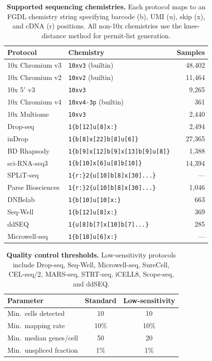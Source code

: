 \documentclass[10pt,twocolumn,letterpaper]{article}
\begin{document}
\begin{table}[t]
  \centering
  \caption{\textbf{Supported sequencing chemistries.} Each protocol maps to
    an FGDL chemistry string specifying barcode (b), UMI (u), skip (x),
    and cDNA (r) positions. All non-10x chemistries use the knee-distance
    method for permit-list generation.}
  \label{tab:protocols}
  \small
  \begin{tabular}{llr}
    \toprule
    \textbf{Protocol} & \textbf{Chemistry} & \textbf{Samples} \\
    \midrule
    10x Chromium v3   & \texttt{10xv3} (builtin) & 48,402 \\
    10x Chromium v2   & \texttt{10xv2} (builtin) & 11,464 \\
    10x 5$'$ v3       & \texttt{10xv3}  & 9,265 \\
    10x Chromium v4   & \texttt{10xv4-3p} (builtin) & 361 \\
    10x Multiome      & \texttt{10xv3}  & 2,440 \\
    Drop-seq          & \texttt{1\{b[12]u[8]x:\}} & 2,494 \\
    inDrop            & \texttt{1\{b[8]x[22]b[8]u[6]\}} & 27,365 \\
    BD Rhapsody       & \texttt{1\{b[9]x[12]b[9]x[13]b[9]u[8]\}} & 1,388 \\
    sci-RNA-seq3      & \texttt{1\{b[10]x[6]u[8]b[10]\}} & 14,394 \\
    SPLiT-seq         & \texttt{1\{r:\}2\{u[10]b[8]x[30]...\}} & --- \\
    Parse Biosciences & \texttt{1\{r:\}2\{u[10]b[8]x[30]...\}} & 1,046 \\
    DNBelab           & \texttt{1\{b[10]u[10]x:\}} & 663 \\
    Seq-Well          & \texttt{1\{b[12]u[8]x:\}} & 369 \\
    ddSEQ             & \texttt{1\{u[8]b[7]x[10]b[7]...\}} & 285 \\
    Microwell-seq     & \texttt{1\{b[18]u[6]x:\}} & --- \\
    \bottomrule
  \end{tabular}
\end{table}

\begin{table}[t]
  \centering
  \caption{\textbf{Quality control thresholds.} Low-sensitivity protocols
    include Drop-seq, Seq-Well, Microwell-seq, SureCell, CEL-seq/2,
    MARS-seq, STRT-seq, iCELL8, Scope-seq, and ddSEQ.}
  \label{tab:qc}
  \small
  \begin{tabular}{lcc}
    \toprule
    \textbf{Parameter} & \textbf{Standard} & \textbf{Low-sensitivity} \\
    \midrule
    Min.\ cells detected & 10 & 10 \\
    Min.\ mapping rate & 10\% & 10\% \\
    Min.\ median genes/cell & 50 & 20 \\
    Min.\ unspliced fraction & 1\% & 1\% \\
    \bottomrule
  \end{tabular}
\end{table}
\end{document}
